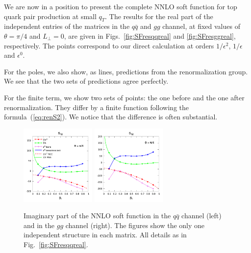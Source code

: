 \documentclass[a4paper,11pt]{article}
\newcommand{\qqbar}{{\ensuremath{q \bar q}}\xspace}
\newcommand{\LT}{L_\perp}
\numberwithin{equation}{section}
\begin{document}
We are now in a position to present the complete NNLO soft function for top
quark pair production at small $q_T$.  The results for the real part of the
independent entries of the matrices in the \qqbar and $gg$ channel, at fixed
values of $\theta = \pi/4$ and $\LT = 0$, are given in
Figs.~\ref{fig:SFresqqreal} and \ref{fig:SFresggreal}, respectively.
%
The points correspond to our direct calculation at orders $1/\epsilon^2$,
$1/\epsilon$ and $\epsilon^0$. 

For the poles, we also show, as lines,
predictions from the renormalization group. We see that the two sets of
predictions agree perfectly.

For the finite term, we show two sets of points: the one
before and the one after renormalization. They differ by a finite function
following the formula~(\ref{eq:renS2}). We notice that the difference is often
substantial.

\begin{figure}[!t]
  \begin{center}
    \includegraphics[width=0.33\textwidth]{plots/soft-function-qq-im-beta.png}
    \hspace{35pt}
    \includegraphics[width=0.33\textwidth]{plots/soft-function-gg-im-beta.png}
  \end{center}
  \caption{
  Imaginary part of the NNLO soft function in the \qqbar channel (left) and in
  the $gg$ channel (right).
  The figures show the only one independent structure in each matrix. All
  details as in Fig.~\ref{fig:SFresqqreal}.
  }
  \label{fig:SFresim}
\end{figure}
\end{document}
